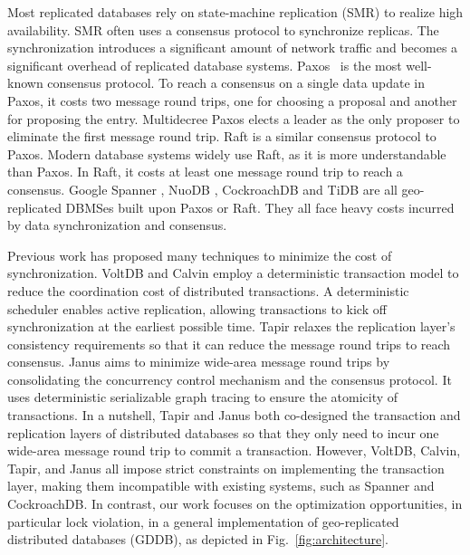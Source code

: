\documentclass[conference]{IEEEtran}
\begin{document}
Most replicated databases rely on state-machine replication (SMR) to realize high availability.
SMR often uses a consensus protocol to synchronize replicas.
The synchronization introduces a significant amount of network traffic and becomes a significant overhead of replicated database systems.
Paxos~\cite{Paxos:journals/tocs/Lamport98} is the most well-known consensus protocol.
To reach a consensus on a single data update in Paxos, it costs two message round trips, one for choosing a proposal and another for proposing the entry.
Multidecree Paxos\cite{Multidecree:journals/csur/RenesseA15} elects a leader as the only proposer to eliminate the first message round trip.
Raft\cite{Raft:conf/usenix/OngaroO14} is a similar consensus protocol to Paxos.
Modern database systems widely use Raft, as it is more understandable than Paxos.
In Raft, it costs at least one message round trip to reach a consensus.
Google Spanner \cite{Spanner:conf/osdi/CorbettDEFFFGGHHHKKLLMMNQRRSSTWW12},
NuoDB \cite{NuoDB}, CockroachDB \cite{CockroachDB} and TiDB \cite{TiDB} are all geo-replicated DBMSes built upon Paxos or Raft.
They all face heavy costs incurred by data synchronization and consensus.

Previous work has proposed many techniques
to minimize the cost of synchronization.
VoltDB \cite{VoltDB} and Calvin \cite{Calvin:conf/sigmod/ThomsonDWRSA12} employ a deterministic transaction model
to reduce the coordination cost of distributed transactions.
A deterministic scheduler enables active replication, allowing transactions to kick off synchronization at the earliest possible time.
Tapir \cite{Tapir:conf/sosp/ZhangSSKP15} relaxes the replication layer's consistency requirements so that it can reduce the message round trips to reach consensus.
Janus \cite{Janus:conf/osdi/MuNLL16} aims to minimize wide-area message round trips
by consolidating the concurrency control mechanism and the consensus protocol.
It uses deterministic serializable graph tracing to ensure the atomicity of transactions.
In a nutshell, Tapir and Janus both co-designed the transaction and replication layers of distributed databases so that they only need to incur one wide-area message round trip to commit a transaction.
However, VoltDB, Calvin, Tapir, and Janus all impose strict constraints on implementing the transaction layer, making them incompatible with existing systems, such as Spanner and CockroachDB.
In contrast, our work focuses on the optimization opportunities, in particular lock violation, in a general implementation of geo-replicated distributed databases (GDDB), as depicted in Fig.~\ref{fig:architecture}.
\end{document}
